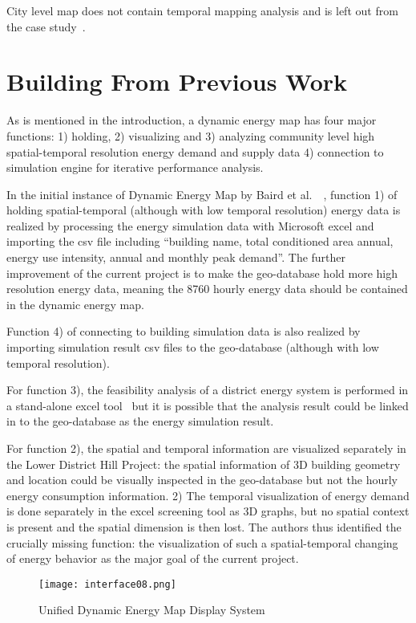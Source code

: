 \documentclass[hidelinks,12pt]{article}
\begin{document}
City level map does not contain temporal mapping analysis and is left
out from the case study~\cite{Diaz2013city}.

\section{Building From Previous Work}
As is mentioned in the introduction, a dynamic energy map has four
major functions: 1) holding, 2) visualizing and 3) analyzing community
level high spatial-temporal resolution energy demand and supply data
4) connection to simulation engine for iterative performance
analysis. 

In the initial instance of Dynamic Energy Map by Baird et al.\
~\cite{baird2014}, function 1) of holding spatial-temporal (although
with low temporal resolution) energy data is realized by processing
the energy simulation data with Microsoft excel and importing the csv
file including ``building name, total conditioned area annual, energy
use intensity, annual and monthly peak demand''. The further
improvement of the current project is to make the geo-database hold
more high resolution energy data, meaning the 8760 hourly energy data
should be contained in the dynamic energy map.

Function 4) of connecting to building simulation data is also realized
by importing simulation result csv files to the geo-database (although
with low temporal resolution).

For function 3), the feasibility analysis of a district energy system
is performed in a stand-alone excel tool~\cite{baird2014} but it is
possible that the analysis result could be linked in to the
geo-database as the energy simulation result. 

For function 2), the spatial and temporal information are visualized
separately in the Lower District Hill Project: the spatial information
of 3D building geometry and location could be visually inspected in
the geo-database but not the hourly energy consumption information. 2)
The temporal visualization of energy demand is done separately in the
excel screening tool as 3D graphs, but no spatial context is present
and the spatial dimension is then lost. The authors thus identified
the crucially missing function: the visualization of such a
spatial-temporal changing of energy behavior as the major goal of the
current project.

\begin{figure}[h!]
  \centering
  \texttt{[image: interface08.png]}
  \caption{Unified Dynamic Energy Map Display System}
  \label{fig:interface08}
\end{figure}
\end{document}
